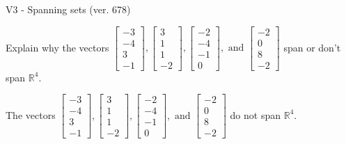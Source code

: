 \begin{exercise}
  \begin{exerciseTitle}V3 - Spanning sets (ver. 678)\end{exerciseTitle}
  \begin{exerciseStatement}
    Explain why the vectors \(\left[\begin{array}{r}
-3 \\
-4 \\
3 \\
-1
\end{array}\right] , \left[\begin{array}{r}
3 \\
1 \\
1 \\
-2
\end{array}\right] , \left[\begin{array}{r}
-2 \\
-4 \\
-1 \\
0
\end{array}\right] , \text{ and } \left[\begin{array}{r}
-2 \\
0 \\
8 \\
-2
\end{array}\right]\) span or don't span \(\mathbb{R}^4\). 
	


  \end{exerciseStatement}
  \begin{exerciseAnswer}
   The vectors \(\left[\begin{array}{r}
-3 \\
-4 \\
3 \\
-1
\end{array}\right] , \left[\begin{array}{r}
3 \\
1 \\
1 \\
-2
\end{array}\right] , \left[\begin{array}{r}
-2 \\
-4 \\
-1 \\
0
\end{array}\right] , \text{ and } \left[\begin{array}{r}
-2 \\
0 \\
8 \\
-2
\end{array}\right]\) 
  	 do not  
	span \(\mathbb{R}^4\).
  


  \end{exerciseAnswer}
\end{exercise}